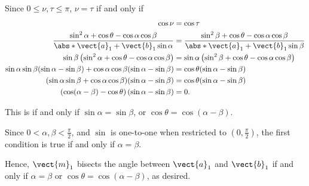 \begin{enumerate}
          Since \(0 \leq \nu, \tau \leq \pi\), \(\nu = \tau\) if and only if
          \begin{align*}
              \cos \nu                                                                                                & = \cos \tau                                                                                             \\
              \frac{\sin^2 \alpha + \cos \theta - \cos \alpha \cos \beta}{\abs*{\vect{a}_1 + \vect{b}_1} \sin \alpha} & = \frac{\sin^2 \beta + \cos \theta - \cos \alpha \cos \beta}{\abs*{\vect{a}_1 + \vect{b}_1} \sin \beta} \\
              \sin \beta \left(\sin^2 \alpha + \cos \theta - \cos \alpha \cos \beta\right)                            & = \sin \alpha \left(\sin^2 \beta + \cos \theta - \cos \alpha \cos \beta\right)                          \\
              \sin \alpha \sin \beta (\sin \alpha - \sin \beta) + \cos \alpha \cos \beta (\sin \alpha - \sin \beta)   & = \cos \theta (\sin \alpha - \sin \beta)                                                                \\
              (\sin \alpha \sin \beta + \cos \alpha \cos \beta) (\sin \alpha - \sin \beta)                            & = \cos \theta (\sin \alpha - \sin \beta)                                                                \\
              \left(\cos (\alpha - \beta) - \cos \theta\right) (\sin \alpha - \sin \beta)                             & = 0.
          \end{align*}

          This is if and only if \(\sin \alpha = \sin \beta\), or \(\cos \theta = \cos (\alpha - \beta)\).

          Since \(0 < \alpha, \beta < \frac{\pi}{2}\), and \(\sin\) is one-to-one when restricted to \(\left(0, \frac{\pi}{2}\right)\), the first condition is true if and only if \(\alpha = \beta\).

          Hence, \(\vect{m}_1\) bisects the angle between \(\vect{a}_1\) and \(\vect{b}_1\) if and only if \(\alpha = \beta\) or \(\cos \theta = \cos (\alpha - \beta)\), as desired.
\end{enumerate}